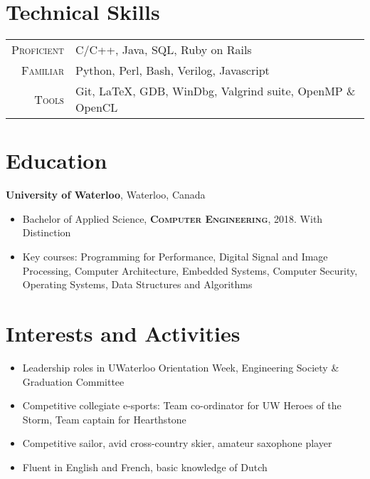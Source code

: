 \documentclass[letterpaper,10pt]{article}
\begin{document}
\begin{minipage}[t]{0.34\textwidth}

\section{Technical Skills}
\medskip

\renewcommand{\arraystretch}{1.8}
\begin{tabularx}{\linewidth}{r | X}

\textsc{Proficient} & C/C++, Java, SQL, Ruby on Rails \\
\textsc{Familiar} & Python, Perl, Bash, Verilog, Javascript \\
\textsc{Tools} & Git, \LaTeX, GDB, WinDbg, Valgrind suite, OpenMP \& OpenCL \\

\end{tabularx}
\renewcommand{\arraystretch}{1}
\medskip

\section{Education}
\textbf{University of Waterloo}, Waterloo, Canada
\smallskip
\begin{itemize}
    \item{Bachelor of Applied Science, \textsc{\textbf{Computer Engineering}}, 2018. With Distinction}
    \item {\footnotesize{Key courses: Programming for Performance, Digital Signal and Image Processing, Computer Architecture, Embedded Systems, Computer Security, Operating Systems, Data Structures and Algorithms}}
\end{itemize}

\medskip

\section{Interests and Activities}
\medskip
\begin{itemize}
	\item {Leadership roles in UWaterloo Orientation Week, Engineering Society \& Graduation Committee}
	\item {Competitive collegiate e-sports: Team co-ordinator for UW Heroes of the Storm, Team captain for Hearthstone}
	\item {Competitive sailor, avid cross-country skier, amateur saxophone player}
    \item {Fluent in English and French, basic knowledge of Dutch}
\end{itemize}


\end{minipage}
\end{document}
